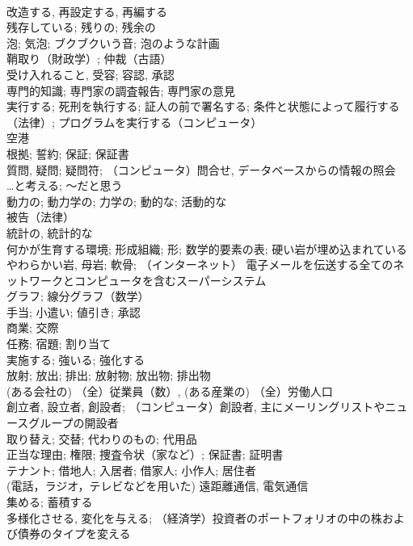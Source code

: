 \documentclass[8pt]{extreport}
\begin{document}
\begin{CJK}{UTF8}{min}
\\	改造する, 再設定する, 再編する	
\\	残存している; 残りの; 残余の	
\\	泡; 気泡; ブクブクいう音; 泡のような計画	
\\	鞘取り（財政学）; 仲裁（古語）	
\\	受け入れること, 受容; 容認, 承認	
\\	専門的知識; 専門家の調査報告; 専門家の意見	
\\	実行する; 死刑を執行する; 証人の前で署名する; 条件と状態によって履行する（法律）; プログラムを実行する（コンピュータ）	
\\	空港	
\\	根拠; 誓約; 保証; 保証書	
\\	質問, 疑問; 疑問符; （コンピュータ）問合せ, データベースからの情報の照会	
\\	…と考える; ～だと思う	
\\	動力の; 動力学の; 力学の; 動的な; 活動的な	
\\	被告（法律）	
\\	統計の, 統計的な	
\\	何かが生育する環境; 形成組織; 形; 数学的要素の表; 硬い岩が埋め込まれているやわらかい岩, 母岩; 軟骨; （インターネット） 電子メールを伝送する全てのネットワークとコンピュータを含むスーパーシステム	
\\	グラフ; 線分グラフ（数学）	
\\	手当; 小遣い; 値引き; 承認	
\\	商業; 交際	
\\	任務; 宿題; 割り当て	
\\	実施する; 強いる; 強化する	
\\	放射; 放出; 排出; 放射物; 放出物; 排出物	
\\	(ある会社の) （全）従業員（数）, (ある産業の) （全）労働人口	
\\	創立者, 設立者, 創設者; （コンピュータ）創設者, 主にメーリングリストやニュースグループの開設者	
\\	取り替え; 交替; 代わりのもの; 代用品	
\\	正当な理由; 権限; 捜査令状（家など）; 保証書; 証明書	
\\	テナント; 借地人; 入居者; 借家人; 小作人; 居住者	
\\	(電話，ラジオ，テレビなどを用いた) 遠距離通信, 電気通信	
\\	集める; 蓄積する	
\\	多様化させる, 変化を与える; （経済学）投資者のポートフォリオの中の株および債券のタイプを変える	

\end{CJK}
\end{document}
